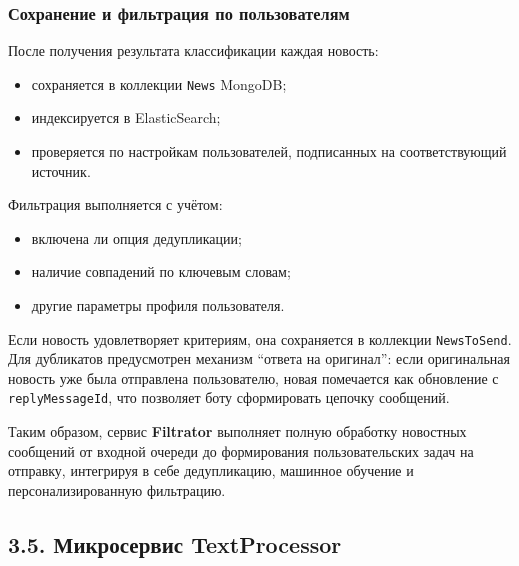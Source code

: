 \hypertarget{ux441ux43eux445ux440ux430ux43dux435ux43dux438ux435-ux438-ux444ux438ux43bux44cux442ux440ux430ux446ux438ux44f-ux43fux43e-ux43fux43eux43bux44cux437ux43eux432ux430ux442ux435ux43bux44fux43c}{%
\subsubsection{\texorpdfstring{\textbf{Сохранение и фильтрация по
пользователям}}{Сохранение и фильтрация по пользователям}}\label{ux441ux43eux445ux440ux430ux43dux435ux43dux438ux435-ux438-ux444ux438ux43bux44cux442ux440ux430ux446ux438ux44f-ux43fux43e-ux43fux43eux43bux44cux437ux43eux432ux430ux442ux435ux43bux44fux43c}}

После получения результата классификации каждая новость:

\begin{itemize}
\tightlist
\item
  сохраняется в коллекции \texttt{News} MongoDB;\\
\item
  индексируется в ElasticSearch;\\
\item
  проверяется по настройкам пользователей, подписанных на
  соответствующий источник.
\end{itemize}

Фильтрация выполняется с учётом:

\begin{itemize}
\tightlist
\item
  включена ли опция дедупликации;\\
\item
  наличие совпадений по ключевым словам;\\
\item
  другие параметры профиля пользователя.
\end{itemize}

Если новость удовлетворяет критериям, она сохраняется в коллекции
\texttt{NewsToSend}. Для дубликатов предусмотрен механизм ``ответа на
оригинал'': если оригинальная новость уже была отправлена пользователю,
новая помечается как обновление с \texttt{replyMessageId}, что позволяет
боту сформировать цепочку сообщений.

Таким образом, сервис \textbf{Filtrator} выполняет полную обработку
новостных сообщений от входной очереди до формирования пользовательских
задач на отправку, интегрируя в себе дедупликацию, машинное обучение и
персонализированную фильтрацию.

\hypertarget{ux43cux438ux43aux440ux43eux441ux435ux440ux432ux438ux441-textprocessor}{%
\subsection{3.5. Микросервис
TextProcessor}\label{ux43cux438ux43aux440ux43eux441ux435ux440ux432ux438ux441-textprocessor}}


